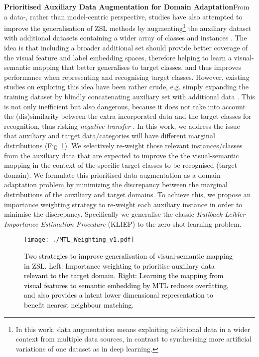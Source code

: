 \documentclass[runningheads]{llncs}
\begin{document}
\noindent\textbf{Prioritised Auxiliary Data Augmentation
  for Domain Adaptation}\quad \newline From a data-, rather than model-centric
perspective, studies have also attempted to improve the generalisation
of ZSL methods by augmenting\footnote{{In this work,
    data augmentation means exploiting additional data in a wider context
    from multiple data sources, in contrast to synthesising more
    artificial variations of one dataset as in deep learning.}}
the  auxiliary dataset with  additional datasets containing a  
wider array of classes and instances \cite{Xu2015,Habibian2014}. 
The idea is that including a broader additional set should provide better coverage of the visual feature and label embedding spaces, 
 therefore helping to learn a visual-semantic mapping that better generalises to target classes, and thus improves performance when representing and recognising target classes.
However, existing studies on exploring this idea have been
rather crude, e.g. simply expanding the training dataset by blindly
concatenating auxiliary set with additional data \cite{Xu2015}. This is not only inefficient but also
dangerous, because it does not take into account the (dis)similarity
between the extra incorporated data and the target classes for
recognition, thus risking {\em negative transfer} \cite{Pan2010}. In
this work, we address the issue that auxiliary and target
data/categories will have different marginal distributions (Fig~\ref{fig:NegativeAuxData}).
We selectively re-weight those relevant instances/classes from the auxiliary data  
that are expected to improve the the visual-semantic mapping in the context of the specific 
 target classes to be recognised (target
domain). We formulate this prioritised data augmentation as
a domain adaptation problem by minimizing 
the discrepancy between the marginal distributions of the auxiliary and
target domains. To achieve this, we propose an importance weighting
strategy to re-weight each auxiliary instance in order to minimise the
discrepancy. Specifically we generalise the classic
\textit{Kullback-Leibler Importance Estimation Procedure}
(KLIEP) \cite{Sugiyama2007,Garcke2014} to the zero-shot learning
problem. 

\begin{figure}[t!]\label{fig:NegativeAuxData}
\centering
\texttt{[image: ./MTL\_Weighting\_v1.pdf]}
\caption{\textcolor{black}{Two strategies to improve generalisation of
    visual-semantic mapping in ZSL. Left: Importance weighting to
    prioritise auxiliary data relevant to the target
    domain. Right: Learning the mapping from visual features  to
    semantic embedding  by MTL reduces overfitting, and also
    provides a latent lower dimensional representation  to benefit nearest neighbour matching.}}
\end{figure}
\end{document}
